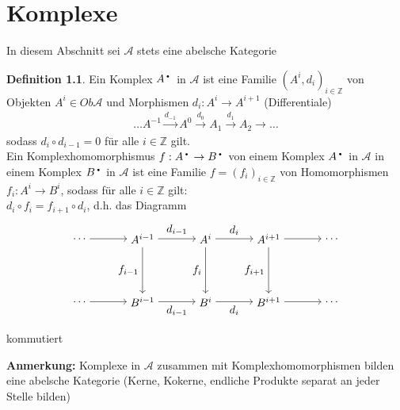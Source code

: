 \documentclass[10pt,a4paper,numbers=endperiod]{scrreprt}
\theoremstyle{definition}
\newtheorem{defi}[satz]{Definition}
\newcommand{\point}{\text{\textbullet}}
\def\ZZ{{\mathbb Z}}
\begin{document}
\chapter{Komplexe} 

In diesem Abschnitt sei $\mathcal{A}$ stets eine abelsche Kategorie\\

\begin{defi}
	Ein Komplex $A^\point$ in $\mathcal{A}$ ist eine Familie $(A^i, d_i)_{i \in \ZZ}$ von Objekten $A^i \in Ob \mathcal{A}$ und Morphismen $d_i: A^i \to A^{i+1}$ (Differentiale) \begin{align*}
	\ldots A^{-1} \overset{d_{-1}}{\to} A^0 \overset{d_0}{\to} A_1 \overset{d_1}{\to} A_2 \to \ldots
	\end{align*} 
	sodass $d_i \circ d_{i-1} = 0$ für alle $i \in \ZZ$ gilt.\\
	Ein Komplexhomomorphismus $f: A^\point \to B^\point$ von einem Komplex $A^\point$ in $\mathcal{A}$ in einem Komplex $B^\point$ in $\mathcal{A}$ ist eine Familie $f = (f_i)_{i \in \ZZ}$ von Homomorphismen $f_i: A^i \to B^i$, sodass für alle $i \in \ZZ$ gilt:\\
	$d_i \circ f_i = f_{i+1} \circ d_i$, d.h. das Diagramm  \begin{align*}
	\begin{tikzpicture}{
		\node (00) at (1,4) {$ \ldots $};
		\node (01) at (3,4) {$ A^{i-1} $};
		\node (02) at (5,4) {$ A^i $};
		\node (03) at (7,4) {$ A^{i+1} $};
		\node (04) at (9,4) {$ \ldots $};
		\node (10) at (1,2) {$ \ldots $};
		\node (11) at (3,2) {$ B^{i-1} $};
		\node (12) at (5,2) {$ B^i $};
		\node (13) at (7,2) {$ B^{i+1} $};
		\node (14) at (9,2) {$ \ldots $};
		\draw[->] (00) edge (01);
		\draw[->] (03) edge (04);
		\draw[->] (10) edge (11);
		\draw[->] (13) edge (14);
		\draw[->] (01) edge node[above] {$ d_{i-1} $} (02);
		\draw[->] (02) edge node[above] {$ d_i $} (03);
		\draw[->] (11) edge node[below] {$ d_{i-1} $} (12);
		\draw[->] (12) edge node[below] {$ d_i $} (13);
		\draw[->] (01) edge node[left] {$ f_{i-1} $} (11);
		\draw[->] (02) edge node[left] {$ f_i $} (12);
		\draw[->] (03) edge node[left] {$ f_{i+1} $} (13);} 
	\end{tikzpicture} \end{align*} 
	kommutiert
\end{defi}

\textbf{Anmerkung:} Komplexe in $\mathcal{A}$ zusammen mit Komplexhomomorphismen bilden eine abelsche Kategorie (Kerne, Kokerne, endliche Produkte separat an jeder Stelle bilden) 
\end{document}
